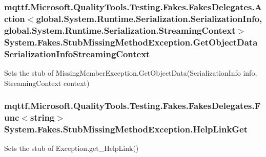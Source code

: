 \hypertarget{class_system_1_1_fakes_1_1_stub_missing_method_exception_a27e72d18a7ce351c0de9b26d46ab1eb7}{
\subsubsection[{Get\-Object\-Data\-Serialization\-Info\-Streaming\-Context}]{\setlength{\rightskip}{0pt plus 5cm}mqttf.\-Microsoft.\-Quality\-Tools.\-Testing.\-Fakes.\-Fakes\-Delegates.\-Action$<$global.\-System.\-Runtime.\-Serialization.\-Serialization\-Info, global.\-System.\-Runtime.\-Serialization.\-Streaming\-Context$>$ System.\-Fakes.\-Stub\-Missing\-Method\-Exception.\-Get\-Object\-Data\-Serialization\-Info\-Streaming\-Context}}\label{class_system_1_1_fakes_1_1_stub_missing_method_exception_a27e72d18a7ce351c0de9b26d46ab1eb7}


Sets the stub of Missing\-Member\-Exception.\-Get\-Object\-Data(\-Serialization\-Info info, Streaming\-Context context)

\hypertarget{class_system_1_1_fakes_1_1_stub_missing_method_exception_a85d04e16e0144dda86c9b23c7b02ad52}{
\subsubsection[{Help\-Link\-Get}]{\setlength{\rightskip}{0pt plus 5cm}mqttf.\-Microsoft.\-Quality\-Tools.\-Testing.\-Fakes.\-Fakes\-Delegates.\-Func$<$string$>$ System.\-Fakes.\-Stub\-Missing\-Method\-Exception.\-Help\-Link\-Get}}\label{class_system_1_1_fakes_1_1_stub_missing_method_exception_a85d04e16e0144dda86c9b23c7b02ad52}


Sets the stub of Exception.\-get\-\_\-\-Help\-Link()

